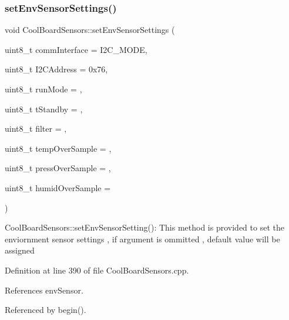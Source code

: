 \subsubsection{\texorpdfstring{set\+Env\+Sensor\+Settings()}{setEnvSensorSettings()}}
{\footnotesize\ttfamily void Cool\+Board\+Sensors\+::set\+Env\+Sensor\+Settings (\begin{DoxyParamCaption}\item[{uint8\+\_\+t}]{comm\+Interface = {\ttfamily I2C\+\_\+MODE},  }\item[{uint8\+\_\+t}]{I2\+C\+Address = {\ttfamily 0x76},  }\item[{uint8\+\_\+t}]{run\+Mode = {},  }\item[{uint8\+\_\+t}]{t\+Standby = {},  }\item[{uint8\+\_\+t}]{filter = {},  }\item[{uint8\+\_\+t}]{temp\+Over\+Sample = {},  }\item[{uint8\+\_\+t}]{press\+Over\+Sample = {},  }\item[{uint8\+\_\+t}]{humid\+Over\+Sample = {} }\end{DoxyParamCaption})}

Cool\+Board\+Sensors\+::set\+Env\+Sensor\+Setting()\+: This method is provided to set the enviornment sensor settings , if argument is ommitted , default value will be assigned 

Definition at line 390 of file Cool\+Board\+Sensors.\+cpp.



References env\+Sensor.



Referenced by begin().


